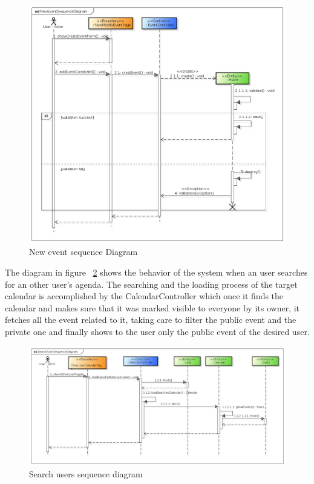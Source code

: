   \begin{center}
 \begin{figure}[H]
    \includegraphics[width=1\textwidth]{./BCEDiagram/BCE/EntityOverview/NewEventSequenceDiagram.png}
    \caption{New event sequence Diagram}
     \label{fig:newEveSeq}
     \end{figure}
   \end{center} 
The diagram in figure ~\ref{fig:searchusSeq} shows the behavior of the system when an user searches for an other user's agenda. The searching and the loading process of the target calendar is accomplished by the CalendarController which once it finds the calendar and makes sure that it was marked visible to everyone by its owner, it fetches all the event related to it, taking care to filter the public event and the private one and finally shows to the user only the public event of the desired user.
 \begin{center}
 \begin{figure}[H]
    \includegraphics[width=1\textwidth]{./BCEDiagram/BCE/EntityOverview/SearchUserSequenceDiagram.png}
    \caption{Search users sequence diagram}
     \label{fig:searchusSeq}
     \end{figure}
   \end{center} 
